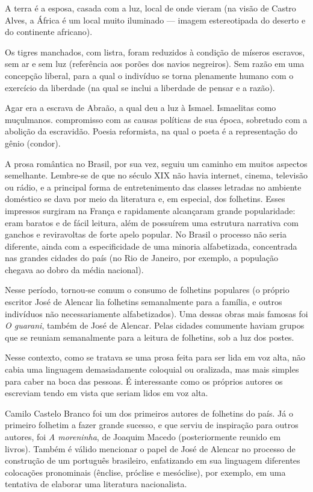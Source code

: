 A terra é a esposa, casada com a luz, local de onde vieram (na visão de Castro Alves, a África é um local muito iluminado — imagem estereotipada do deserto e do continente africano).

Os tigres manchados, com listra, foram reduzidos à condição de míseros escravos, sem ar e sem luz (referência aos porões dos navios negreiros). Sem razão em uma concepção liberal, para a qual o indivíduo se torna plenamente humano com o exercício da liberdade (na qual se inclui a liberdade de pensar e a razão).

Agar era a escrava de Abraão, a qual deu a luz à Ismael. Ismaelitas como muçulmanos. compromisso com as causas políticas de sua época, sobretudo com a abolição da escravidão. Poesia reformista, na qual o poeta é a representação do gênio (condor).

A prosa romântica no Brasil, por sua vez, seguiu um caminho em muitos aspectos semelhante. Lembre-se de que no século XIX não havia internet, cinema, televisão ou rádio, e a principal forma de entretenimento das classes letradas no ambiente doméstico se dava por meio da literatura e, em especial, dos folhetins. Esses impressos surgiram na França e rapidamente alcançaram grande popularidade: eram baratos e de fácil leitura, além de possuírem uma estrutura narrativa com ganchos e reviravoltas de forte apelo popular. No Brasil o processo não seria diferente, ainda com a especificidade de uma minoria alfabetizada, concentrada nas grandes cidades do país (no Rio de Janeiro, por exemplo, a população chegava ao dobro da média nacional).

Nesse período, tornou-se comum o consumo de folhetins populares (o próprio escritor José de Alencar lia folhetins semanalmente para a família, e outros indivíduos não necessariamente alfabetizados). Uma dessas obras mais famosas foi \textit{O guarani}, também de José de Alencar. Pelas cidades comumente haviam grupos que se reuniam semanalmente para a leitura de folhetins, sob a luz dos postes.

Nesse contexto, como se tratava se uma prosa feita para ser lida em voz alta, não cabia uma linguagem demasiadamente coloquial ou oralizada, mas mais simples para caber na boca das pessoas. É interessante como os próprios autores os escreviam tendo em vista que seriam lidos em voz alta.

Camilo Castelo Branco foi um dos primeiros autores de folhetins do país. Já o primeiro folhetim a fazer grande sucesso, e que serviu de inspiração para outros autores, foi \textit{A moreninha}, de Joaquim Macedo (posteriormente reunido em livros). Também é válido mencionar o papel de José de Alencar no processo de construção de um português brasileiro, enfatizando em sua linguagem diferentes colocações pronominais (ênclise, próclise e mesóclise), por exemplo, em uma tentativa de elaborar uma literatura nacionalista.

